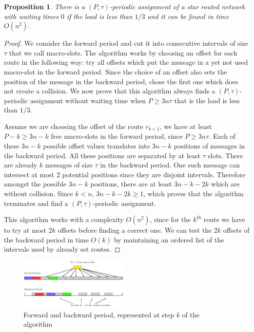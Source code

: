 \documentclass[a4paper,10pt]{article}
\newtheorem{proposition}{Proposition}
\begin{document}
    
    \begin{proposition}
    There is a $(P,\tau)$-periodic assignment of a star routed network with waiting times $0$ if the load is less than $1/3$ and it can be found in time $O(n^2)$.
    \end{proposition}
    \begin{proof}
     We consider the forward period and cut it into consecutive intervals of size $\tau$ that we call macro-slots. The algorithm works by choosing an offset for each route in the following way: try all offsets which put the message in a yet not used macro-slot in the forward
     period. Since the choice of an offset also sets the position of the message in the backward period, chose the first one which does not create a collision. We now prove that this algorithm always finds a $(P,\tau)$-periodic assignment without waiting time when $P \geq 3n\tau$ that is the load is less than $1/3$.
     
     Assume we are choosing the offset of the route $r_{k+1}$, we have at least $P - k \geq 3n - k$ free macro-slots in the forward period, since $P \geq 3n\tau$. Each of these $3n - k$ possible offset values translates into $3n - k$ positions of messages in the backward period. All these positions are separated by at least $\tau$ slots. There are already $k$ messages of size $\tau$ in the backward period. One such message can intersect at most $2$ potential positions since they are disjoint intervals. Therefore  amongst the possible $3n - k$ positions, there are  at least $3n - k -2k$ which are without collision. Since $k < n$, $3n - k -2k \geq 1$, which proves that the algorithm terminates and find a  $(P,\tau)$-periodic assignment. 
   
     This algorithm works with a complexity $O(n^2)$, since for the $k^{\text{th}}$ route we have to try at most $2k$ offsets before finding a correct one. We can test the $2k$ offsets of the backward period in time $O(k)$ by maintaining an ordered list of the intervals used by already set routes.
     \end{proof}
     \begin{figure}
      \begin{center}
      \includegraphics[width=0.48\textwidth]{ex3nt.pdf}
      \end{center}
      \caption{Forward and backward period, represented at step $k$ of the algorithm}
      \end{figure}
\end{document}

